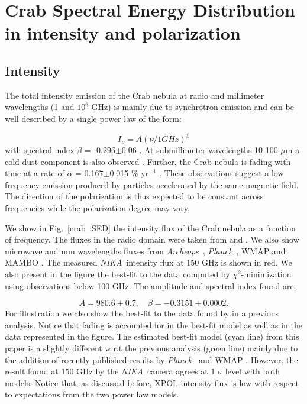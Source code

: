 \documentclass[twocolumn,traditabstract]{aa}
\def\NIKA{\textit{NIKA}}
\def\Archeops{\textit{Archeops}}
\def\Planck{\textit{Planck}}
\begin{document}
\section{Crab Spectral Energy Distribution in intensity and polarization}\label{sec:Polarization intensity Spectral Energy Density (SED)}
\subsection{Intensity}
The total intensity emission of the Crab nebula at radio and millimeter wavelengths (1 and $10^6$ GHz) is mainly due to synchrotron emission and can be well described by a single power law of the form:

\begin{equation}
I_{\nu} = A(\nu / 1 GHz)^{\beta}
\end{equation}\label{eq:sync}
 with spectral index $\beta$ = -0.296$\pm$0.06 \citep{baars1977absolute,macias2010}. At submillimeter wavelengths 10-100 $\mu$m a cold dust component is also observed \citep{macias2010}. Further, the Crab nebula is fading with time at a rate of $\alpha$ = 0.167$\pm$0.015 \% yr$^{-1}$ \citep{aller1985decrease}. 
These observations suggest a low frequency emission produced by particles accelerated by the same magnetic field. The direction of the polarization is thus expected to be constant across frequencies while the polarization degree may vary. 

We show in Fig.~\ref{crab_SED} the intensity flux of the Crab nebula as a function of frequency. The fluxes in the radio domain were taken from \cite{dmitrenko1970absolute} and \cite{1971IzVUZ..14..157V}. We also show microwave and mm wavelengths fluxes from \Archeops\ \citep{macias2007archeops}, \Planck\ \citep{2015arXiv150702058P}, WMAP \citep{2011ApJS..192...19W} and MAMBO \citep{2002A&A...386.1044B}. The measured \NIKA\ intensity flux at 150 GHz is shown in red.
We also present in the figure the best-fit to the data computed by $\chi^2$-minimization using observations below 100 GHz. The amplitude and spectral index found are: 

\begin{equation}
 A = 980.6 \pm 0.7  ,\quad \beta = -0.3151 \pm 0.0002. 
 \end{equation}
 For illustration we also show the best-fit to the data found by \cite{macias2010} in a previous analysis. 
Notice that fading is accounted for in the best-fit model as well as in the data represented in the figure.
The estimated best-fit model (cyan line) from this paper is a slightly different w.r.t the previous analysis (green line) mainly due to the addition of recently published results by \Planck\ \citep{2015arXiv150702058P} and  WMAP \citep{2011ApJS..192...19W}. However, the result found at 150 GHz by the \NIKA\ camera agrees at 1 $\sigma$ level with both models. 
Notice that, as discussed before, XPOL intensity flux is low with respect to expectations from the two power law models. 
 
\end{document}
